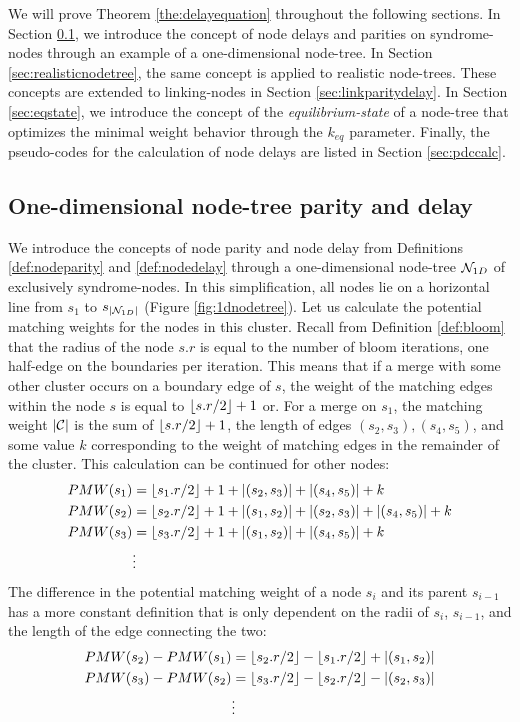 We will prove Theorem \ref{the:delayequation} throughout the following sections. In Section \ref{sec:1dnodetree}, we introduce the concept of node delays and parities on syndrome-nodes through an example of a one-dimensional node-tree. In Section \ref{sec:realisticnodetree}, the same concept is applied to realistic node-trees. These concepts are extended to linking-nodes in Section \ref{sec:linkparitydelay}. In Section \ref{sec:eqstate}, we introduce the concept of the \emph{equilibrium-state} of a node-tree that optimizes the minimal weight behavior through the $k_{eq}$ parameter. Finally, the pseudo-codes for the calculation of node delays are listed in Section \ref{sec:pdccalc}.

\subsection{One-dimensional node-tree parity and delay}\label{sec:1dnodetree}

We introduce the concepts of node parity and node delay from Definitions \ref{def:nodeparity} and \ref{def:nodedelay} through a one-dimensional node-tree $\mathcal{N}_{1D}$ of exclusively syndrome-nodes. In this simplification, all nodes lie on a horizontal line from $s_1$ to $s_{|\mathcal{N}_{1D}|}$ (Figure \ref{fig:1dnodetree}). Let us calculate the potential matching weights for the nodes in this cluster. Recall from Definition \ref{def:bloom} that the radius of the node $s.r$ is equal to the number of bloom iterations, one half-edge on the boundaries per iteration. This means that if a merge with some other cluster occurs on a boundary edge of $s$, the weight of the matching edges within the node $s$ is equal to ${\left \lfloor s.r/2 \right \rfloor }+1$ or. For a merge on $s_1$, the matching weight $|\mathcal{C}|$ is the sum of ${\left \lfloor s.r/2 \right \rfloor }+1$, the length of edges $(s_2,s_3), (s_4,s_5)$, and some value $k$ corresponding to the weight of matching edges in the remainder of the cluster. This calculation can be continued for other nodes:
\begin{align*}
  PMW(s_1) &= {\left \lfloor s_1.r/2 \right \rfloor }+1 + \abs{(s_2,s_3)} + \abs{(s_4,s_5)} + k \\
  PMW(s_2) &= {\left \lfloor s_2.r/2 \right \rfloor }+1 + \abs{(s_1,s_2)} + \abs{(s_2,s_3)} + \abs{(s_4,s_5)} + k \\
  PMW(s_3) &= {\left \lfloor s_3.r/2 \right \rfloor }+1 + \abs{(s_1,s_2)} + \abs{(s_4,s_5)} + k\\
  &\vdots
\end{align*}
The difference in the potential matching weight of a node $s_i$ and its parent $s_{i-1}$ has a more constant definition that is only dependent on the radii of $s_i$,  $s_{i-1}$, and the length of the edge connecting the two:
\begin{align*}
  PMW(s_2) - PMW(s_1) &= {\left \lfloor s_2.r/2 \right \rfloor } - {\left \lfloor s_1.r/2 \right \rfloor } + \abs{(s_1,s_2)} \\
  PMW(s_3) - PMW(s_2) &= {\left \lfloor s_3.r/2 \right \rfloor } - {\left \lfloor s_2.r/2 \right \rfloor } - \abs{(s_2,s_3)} \\
  &\vdots
\end{align*}

